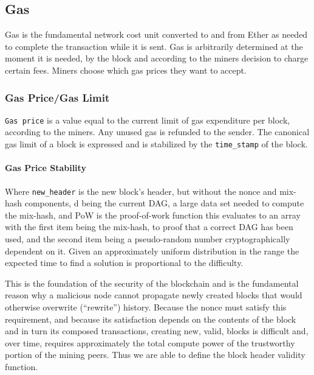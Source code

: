 \documentclass[10pt,letterpaper,leqno,bibliography=totoc]{scrartcl}
\newenvironment{alphafootnotes}
{\par\edef\savedfootnotenumber{\number\value{footnote}}
\renewcommand{\thefootnote}{\alph{footnote}}
\setcounter{footnote}{0}}
{\par\setcounter{footnote}{\savedfootnotenumber}}
\begin{document}
\begin{alphafootnotes}
\begin{multicols*}{2}
				\subsection{Gas}
				Gas is the fundamental network cost unit converted to and from Ether as needed to complete the transaction while it is sent. Gas is arbitrarily determined at the moment it is needed, by the block and according to the miners decision to charge certain fees. Miners choose which gas prices they want to accept.
	
				\subsubsection{Gas Price/Gas Limit}
					\texttt{Gas price} is a value equal to the current limit of gas expenditure per block, according to the miners. Any unused gas is refunded to the sender. The canonical gas limit of a block is expressed  and is stabilized by the \texttt{time\_stamp} of the block.

				\paragraph{Gas Price Stability}
					Where \texttt{new\_header} is the new block’s header, but without the nonce and mix-hash components, d being the current DAG, a large data set needed to compute the mix-hash, and PoW is the proof-of-work function this evaluates to an array with the first item being the mix-hash, to proof that a correct DAG has been used, and the second item being a pseudo-random number cryptographically dependent on it. Given an approximately uniform distribution in the range the expected time to find a solution is proportional to the difficulty.\supercite{Wood2017} 
					
					
					This is the foundation of the security of the blockchain and is the fundamental reason why a malicious node cannot propagate newly created blocks that would otherwise overwrite (“rewrite”) history. Because the nonce must satisfy this requirement, and because its satisfaction depends on the contents of the block and in turn its composed transactions, creating new, valid, blocks is difficult and, over time, requires approximately the total compute power of the trustworthy portion of the mining peers. Thus we are able to define the block header validity function.
				

\end{multicols*}
\end{alphafootnotes}
\end{document}
